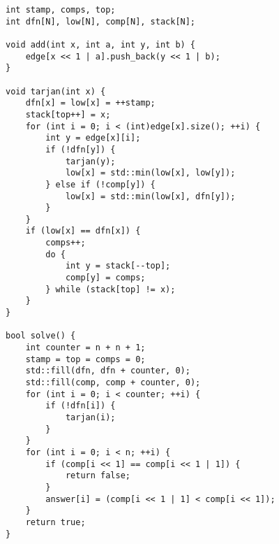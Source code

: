 \begin{lstlisting}
int stamp, comps, top;
int dfn[N], low[N], comp[N], stack[N];

void add(int x, int a, int y, int b) {
    edge[x << 1 | a].push_back(y << 1 | b);
}

void tarjan(int x) {
    dfn[x] = low[x] = ++stamp;
    stack[top++] = x;
    for (int i = 0; i < (int)edge[x].size(); ++i) {
        int y = edge[x][i];
        if (!dfn[y]) {
            tarjan(y);
            low[x] = std::min(low[x], low[y]);
        } else if (!comp[y]) {
            low[x] = std::min(low[x], dfn[y]);
        }
    }
    if (low[x] == dfn[x]) {
        comps++;
        do {
            int y = stack[--top];
            comp[y] = comps;
        } while (stack[top] != x);
    }
}

bool solve() {
    int counter = n + n + 1;
    stamp = top = comps = 0;
    std::fill(dfn, dfn + counter, 0);
    std::fill(comp, comp + counter, 0);
    for (int i = 0; i < counter; ++i) {
        if (!dfn[i]) {
            tarjan(i);
        }
    }
    for (int i = 0; i < n; ++i) {
        if (comp[i << 1] == comp[i << 1 | 1]) {
            return false;
        }
        answer[i] = (comp[i << 1 | 1] < comp[i << 1]);
    }
    return true;
}
\end{lstlisting}

